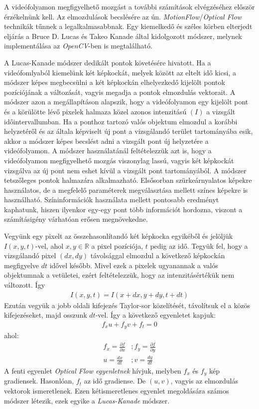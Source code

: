 A videófolyamon megfigyelhető mozgást a további számítások elvégzéséhez először érzékelnünk kell. Az elmozdulások becslésére az ún. \textit{MotionFlow}/\textit{Optical Flow} technikák tűnnek a legalkalmasabbnak. Egy kiemelkedő és széles körben elterjedt eljárás a Bruce D. Lucas és Takeo Kanade által kidolgozott módszer, melynek implementálása az \textit{OpenCV}-ben is megtalálható.

A Lucas-Kanade módszer dedikált pontok követésére hivatott. Ha a videófomlyaból kiemelünk két képkockát, melyek között az eltelt idő kicsi, a módszer képes megbecsülni a két képkockán elhelyezkedő kijelölt pontok pozíciójának a változását, vagyis megadja a pontok elmozdulás vektorait. A módszer azon a megállapításon alapszik, hogy a videófolyamon egy kijelölt pont és a körülötte lévő pixelek halmaza közel azonos intenzitású $(I)$ a vizsgált időintervallumban. Ha a ponthoz tartozó valós objektum elmozdul a korábbi helyzetéről és az általa képviselt új pont a vizsgálandó terület tartományába esik, akkor a módszer képes becslést adni a vizsgált pont új helyzetére a videófolyamon. A módszer használatánál feltételezzük azt is, hogy a videófolyamon megfigyelhető mozgás viszonylag lassú, vagyis két képkockát vizsgálva az új pont nem eshet kívül a vizsgált pont tartományából. A módszer tetszőleges pontok halmazára alkalmazható. Elsősorban szürkeárnyalatos képekre használatos, de a megfelelő paraméterek megválasztása mellett színes képekre is használható. Színinformációk használata mellett pontosabb eredményt kaphatunk, hiszen ilyenkor egy-egy pont több információt hordozna, viszont a számításigény várhatóan erősen megnövekedne. 

Vegyünk egy pixelt az összehasonlítandó két képkocka egyikéből és jelöljük $I(x,y,t)$-vel, ahol $x,y \in \mathbb{R}$ a pixel pozíciója, $t$ pedig az idő. Tegyük fel, hogy a vizsgálandó pixel $(dx, dy)$ távolsággal elmozdul a következő képkockán megfigyelve $dt$ idővel később. Mivel ezek a pixelek ugyanannak a valós objektumnak a vetületei, ezért feltételezzük, hogy az intenzitásértékük nem változott. Így
\begin{align*}
I(x,y,t) = I(x+dx,y+dy,t+dt)
\end{align*}
Ezután vegyük a jobb oldali kifejezés Taylor-sor közelítését, távolítsuk el a közös kifejezéseket, majd osszunk $dt$-vel. Így a következő egyenletet kapjuk:
\begin{align*}
f_xu+f_yv+f_t=0
\end{align*}
ahol:
\begin{align*}
f_x = \frac{\partial f}{\partial x} &; f_y = \frac{\partial f}{\partial y}\\
u = \frac{dx}{dt} &; v = \frac{dy}{dt}
\end{align*}
A fenti egyenlet \textit{Optical Flow egyenletnek} hívjuk, melyben $f_x$ és $f_y$ kép gradiensek. Hasonlóan, $f_t$ az idő gradiense. De $(u,v)$, vagyis az elmozdulás vektorok ismeretlenek. Ezen kétismeretlenes egyenlet megoldására számos módszer létezik, ezek egyike a \textit{Lucas-Kanade} módszer.

